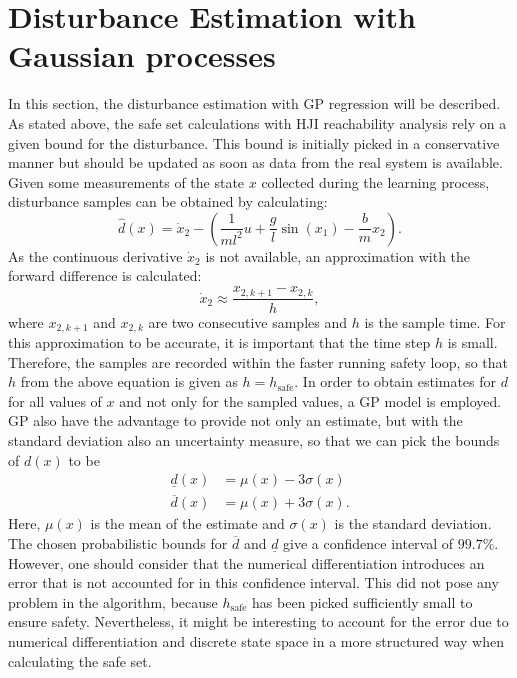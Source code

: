 \documentclass[../main.tex]{subfiles}
\begin{document}
\section{Disturbance Estimation with Gaussian processes}\label{sec:implementation_GP}
In this section, the disturbance estimation with GP regression will be described. As stated above, the safe set calculations with HJI reachability analysis rely on a given bound for the disturbance. This bound is initially picked in a conservative manner but should be updated as soon as data from the real system is available. Given some measurements of the state $x$ collected during the learning process, disturbance samples can be obtained by calculating:
\begin{equation}
    \hat{d}(x)=\dot{x}_2-\left(\frac{1}{ml^2}u+\frac{g}{l}\sin(x_1)-\frac{b}{m}x_2\right).
\end{equation}
As the continuous derivative $\dot{x}_2$ is not available, an approximation with the forward difference is calculated:
\begin{equation}
    \dot{x}_2 \approx \frac{x_{2,k+1}-x_{2,k}}{h},
\end{equation}
where $x_{2,k+1}$ and $x_{2,k}$ are two consecutive samples and $h$ is the sample time.
For this approximation to be accurate, it is important that the time step $h$ is small. Therefore, the samples are recorded within the faster running safety loop, so that $h$ from the above equation is given as $h = h_{\text{safe}}$.
In order to obtain estimates for $d$ for all values of $x$ and not only for the sampled values, a GP model is employed. GP also have the advantage to provide not only an estimate, but with the standard deviation also an uncertainty measure, so that we can pick the bounds of $d(x)$ to be
\begin{align}
    \underline{d}(x) &= \mu(x)-3\sigma(x)\\
    \overline{d}(x) &= \mu(x)+3\sigma(x).
\end{align}
Here, $\mu(x)$ is the mean of the estimate and $\sigma(x)$ is the standard deviation. The chosen  probabilistic bounds for $\overline{d}$ and $\underline{d}$ give a confidence interval of $99.7\%$. However, one should consider that the numerical differentiation introduces an error that is not accounted for in this confidence interval. This did not pose any problem in the algorithm, because $h_{\text{safe}}$ has been picked sufficiently small to ensure safety. Nevertheless, it might be interesting to account for the error due to numerical differentiation and discrete state space in a more structured way when calculating the safe set. \par
\end{document}

